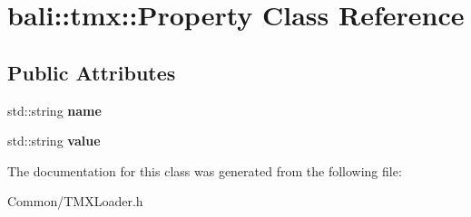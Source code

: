 \hypertarget{classbali_1_1tmx_1_1_property}{\section{bali\-:\-:tmx\-:\-:Property Class Reference}
\label{classbali_1_1tmx_1_1_property}
}
\subsection*{Public Attributes}
\begin{DoxyCompactItemize}
\item 
\hypertarget{classbali_1_1tmx_1_1_property_a5bfb2c924bac03e427463c63f5513704}{std\-::string {\bfseries name}}\label{classbali_1_1tmx_1_1_property_a5bfb2c924bac03e427463c63f5513704}

\item 
\hypertarget{classbali_1_1tmx_1_1_property_ad288691e9a9337a612679d8b6f0e0e1e}{std\-::string {\bfseries value}}\label{classbali_1_1tmx_1_1_property_ad288691e9a9337a612679d8b6f0e0e1e}

\end{DoxyCompactItemize}


The documentation for this class was generated from the following file\-:\begin{DoxyCompactItemize}
\item 
Common/T\-M\-X\-Loader.\-h\end{DoxyCompactItemize}
